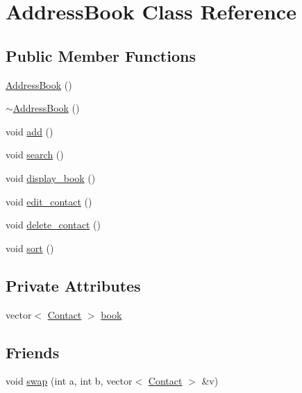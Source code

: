 \hypertarget{classAddressBook}{}\section{Address\+Book Class Reference}
\label{classAddressBook}
\subsection*{Public Member Functions}
\begin{DoxyCompactItemize}
\item 
\hyperlink{classAddressBook_ad2d2cebd2a3aa00130f769684bc8ddea}{Address\+Book} ()
\item 
\hyperlink{classAddressBook_a5638d9e7361248f33d52894f65597d47}{$\sim$\+Address\+Book} ()
\item 
void \hyperlink{classAddressBook_a55d96137f232d3a52ffb51917d31b32b}{add} ()
\item 
void \hyperlink{classAddressBook_ae4483418575343aa8d53244365a7e475}{search} ()
\item 
void \hyperlink{classAddressBook_ade80a4ffa27ed8a4f9c5c62372d34ea3}{display\+\_\+book} ()
\item 
void \hyperlink{classAddressBook_a524c975a4983e6a0b50f1e89acafa6bb}{edit\+\_\+contact} ()
\item 
void \hyperlink{classAddressBook_a96636dca787ba1a6e3d6ab7b8eb55e45}{delete\+\_\+contact} ()
\item 
void \hyperlink{classAddressBook_a7021de85815ec3aed9d2173fc15faa9b}{sort} ()
\end{DoxyCompactItemize}
\subsection*{Private Attributes}
\begin{DoxyCompactItemize}
\item 
vector$<$ \hyperlink{classContact}{Contact} $>$ \hyperlink{classAddressBook_a4f15fc599aaafa71de6eb897e2565baa}{book}
\end{DoxyCompactItemize}
\subsection*{Friends}
\begin{DoxyCompactItemize}
\item 
void \hyperlink{classAddressBook_a5cd138fa046f34ab9825f38080786c77}{swap} (int a, int b, vector$<$ \hyperlink{classContact}{Contact} $>$ \&v)
\end{DoxyCompactItemize}


